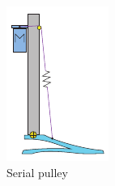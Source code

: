 

\begin{figure}[hb!]
\label{fig:compliance}
  \begin{subfigure}{.19\textwidth}
    \centering
    \includegraphics[width=\linewidth]{figures/illustration_serial_pulley.pdf}
    \caption{Serial pulley}
    \label{fig:series_pulley}
  \end{subfigure}
  \begin{subfigure}{.19\textwidth}
    \centering

\end{subfigure}
\end{figure}
